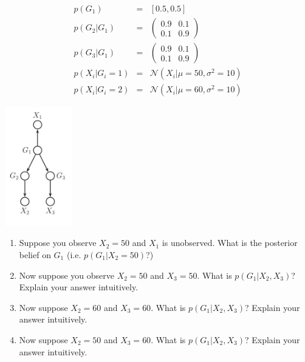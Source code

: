 \documentclass{article}
\begin{document}
\begin{enumerate}
\begin{minipage}{0.6\textwidth}
\vspace{-30pt}
\begin{eqnarray*}
p(G_1) &=& [0.5, 0.5] \\
p(G_2|G_1) &=& \left( \begin{matrix} 0.9 & 0.1 \\ 0.1 & 0.9 \end{matrix} \right) \\
p(G_3|G_1) &=&  \left( \begin{matrix} 0.9 & 0.1 \\ 0.1 & 0.9 \end{matrix} \right) \\
p(X_i | G_i =1) &=& \mathcal N (X_i | \mu=50, \sigma^2 =10) \\
p(X_i | G_i =2) &=& \mathcal N (X_i | \mu=60, \sigma^2 =10) 
\end{eqnarray*}
\end{minipage}
\begin{minipage}{0.7\textwidth}
\includegraphics[width=0.22\textwidth]{fig_hw3}
\end{minipage}

\begin{enumerate}
\item Suppose you observe $X_2=50$ and $X_1$ is unobserved. What is the posterior belief on $G_1$ (i.e. $p(G_1|X_2=50)$?)
\item Now suppose you observe $X_2=50$ and $X_3=50$. What is $p(G_1| X_2, X_3)$? Explain your answer intuitively.
\item Now suppose $X_2=60$ and $X_3=60$. What is $p(G_1| X_2, X_3)$? Explain your answer intuitively.
\item Now suppose $X_2=50$ and $X_3=60$. What is $p(G_1| X_2, X_3)$? Explain your answer intuitively.
\end{enumerate}

\end{enumerate}
\end{document}
